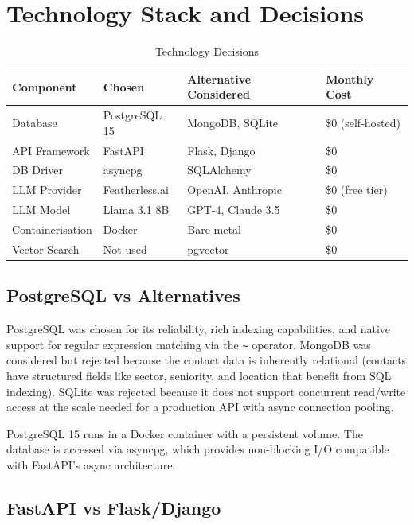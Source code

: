 \documentclass[12pt, a4paper]{report}
\begin{document}
\chapter{Technology Stack and Decisions}

\begin{table}[H]
\centering
\begin{tabular}{p{3cm}p{3cm}p{4cm}p{3cm}}
\toprule
\textbf{Component} & \textbf{Chosen} & \textbf{Alternative Considered} & \textbf{Monthly Cost} \\
\midrule
Database & PostgreSQL 15 & MongoDB, SQLite & \$0 (self-hosted) \\
API Framework & FastAPI & Flask, Django & \$0 \\
DB Driver & asyncpg & SQLAlchemy & \$0 \\
LLM Provider & Featherless.ai & OpenAI, Anthropic & \$0 (free tier) \\
LLM Model & Llama 3.1 8B & GPT-4, Claude 3.5 & \$0 \\
Containerisation & Docker & Bare metal & \$0 \\
Vector Search & Not used & pgvector & \$0 \\
\bottomrule
\end{tabular}
\caption{Technology Decisions}
\end{table}

\section{PostgreSQL vs Alternatives}

PostgreSQL was chosen for its reliability, rich indexing capabilities, and native support for regular expression matching via the \texttt{\textasciitilde} operator. MongoDB was considered but rejected because the contact data is inherently relational (contacts have structured fields like sector, seniority, and location that benefit from SQL indexing). SQLite was rejected because it does not support concurrent read/write access at the scale needed for a production API with async connection pooling.

PostgreSQL 15 runs in a Docker container with a persistent volume. The database is accessed via asyncpg, which provides non-blocking I/O compatible with FastAPI's async architecture.

\section{FastAPI vs Flask/Django}
\end{document}
